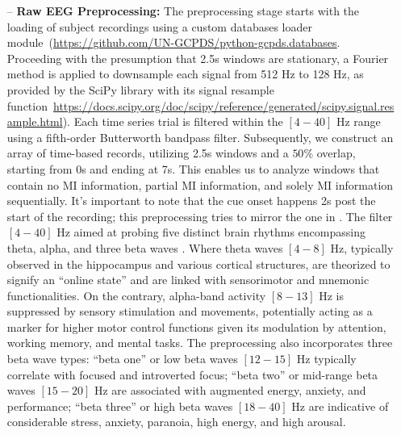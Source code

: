\begin{itemize}

    \item[--] \textbf{Raw EEG Preprocessing:} The preprocessing stage starts with the loading of subject recordings using a custom databases loader module~(\url{https://github.com/UN-GCPDS/python-gcpds.databases}. Proceeding with the presumption that 2.5s windows are stationary, a Fourier method is applied to downsample each signal from 512 Hz to 128 Hz, as provided by the SciPy library with its signal resample function~\url{https://docs.scipy.org/doc/scipy/reference/generated/scipy.signal.resample.html}). Each time series trial is filtered within the $[4-40]$ Hz range using a fifth-order Butterworth bandpass filter. Subsequently, we construct an array of time-based records, utilizing 2.5s windows and a $50\%$ overlap, starting from 0s and ending at 7s. This enables us to analyze windows that contain no MI information, partial MI information, and solely MI information sequentially. It's important to note that the cue onset happens 2s post the start of the recording; this preprocessing tries to mirror the one in \cite{lawhern2018eegnet}. The filter $[4-40]$ Hz aimed at probing five distinct brain rhythms encompassing theta, alpha, and three beta waves \cite{ABHANG201651}. Where theta waves $[4-8]$ Hz, typically observed in the hippocampus and various cortical structures, are theorized to signify an ``online state'' and are linked with sensorimotor and mnemonic functionalities. On the contrary, alpha-band activity $[8-13]$ Hz is suppressed by sensory stimulation and movements, potentially acting as a marker for higher motor control functions given its modulation by attention, working memory, and mental tasks. The preprocessing also incorporates three beta wave types: ``beta one'' or low beta waves $[12-15]$ Hz typically correlate with focused and introverted focus; ``beta two'' or mid-range beta waves $[15-20]$ Hz are associated with augmented energy, anxiety, and performance; ``beta three'' or high beta waves $[18-40]$ Hz are indicative of considerable stress, anxiety, paranoia, high energy, and high arousal.


\end{itemize}
